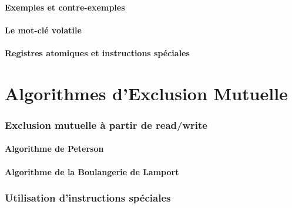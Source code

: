 \documentclass[9pt]{beamer}
\begin{document}
\subsection{Exemples et contre-exemples}





 
\subsection{Le mot-clé volatile}


 
\subsection{Registres atomiques et instructions spéciales}



 
 
 
\part{Algorithmes d'Exclusion Mutuelle}
 
 
\section{Exclusion mutuelle à partir de read/write}
 
\subsection{Algorithme de Peterson}





 
\subsection{Algorithme de la Boulangerie de Lamport}


 
\section{Utilisation d'instructions spéciales}
 
\end{document}
